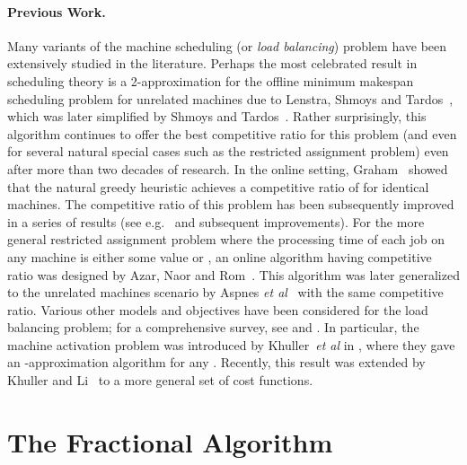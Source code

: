 \documentclass[11pt]{article}
\begin{document}
\paragraph{Previous Work.} 
Many variants of the machine scheduling (or {\em load balancing}) problem have been 
extensively studied in the literature. Perhaps the most celebrated result in 
scheduling theory is a 2-approximation for the offline minimum makespan scheduling problem
for unrelated machines due to Lenstra, Shmoys and Tardos~\cite{LenstraST90},
which was later simplified by Shmoys and Tardos~\cite{ShmoysT93}.
Rather surprisingly, this algorithm continues to offer the best competitive ratio for
this problem (and even for several natural special cases such as the restricted
assignment problem) even after more than two decades
of research. 
In the online setting, Graham~\cite{Graham66, Graham69} showed that the natural greedy
heuristic achieves
a competitive ratio of  for  identical machines. The competitive ratio of 
this problem has been subsequently improved in a series of results 
(see e.g.~\cite{BartalFKV95} and subsequent improvements). 
For the more general restricted assignment problem
where the processing time of each job  on any machine is either some value  
or , an online algorithm having competitive ratio  was designed
by Azar, Naor and Rom~\cite{AzarNR95}. This algorithm was later generalized to 
the unrelated machines scenario by Aspnes {\em et al}~\cite{AspnesAFPW97} 
with the same competitive ratio.
Various other models and objectives have been considered for the load balancing 
problem; for a comprehensive survey, see \cite{Azar96} and \cite{Sgall96}. 
In particular, the machine activation problem was introduced by 
Khuller~{\em et al} in \cite{KhullerLS10}, where they gave an 
-approximation algorithm for
any . Recently, this result was extended by Khuller and
Li~\cite{LiK11} to a more general set of cost functions.





























\section{The Fractional Algorithm}
\label{sec:fractional}
\end{document}
